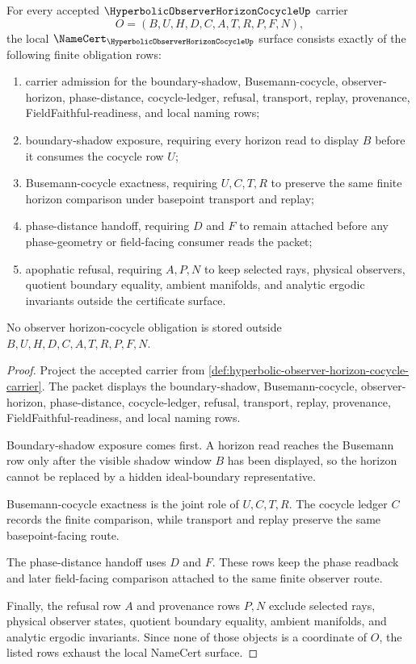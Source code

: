 \begin{theorem}
\label{thm:hyperbolic-observer-horizon-cocycle-namecert-obligations}
For every accepted $\HyperbolicObserverHorizonCocycleUp$ carrier
$$
O=(B,U,H,D,C,A,T,R,P,F,N),
$$
the local $\NameCert_{\HyperbolicObserverHorizonCocycleUp}$ surface consists exactly of the following finite obligation rows:
\begin{enumerate}
\item carrier admission for the boundary-shadow, Busemann-cocycle, observer-horizon, phase-distance, cocycle-ledger, refusal, transport, replay, provenance, FieldFaithful-readiness, and local naming rows;
\item boundary-shadow exposure, requiring every horizon read to display $B$ before it consumes the cocycle row $U$;
\item Busemann-cocycle exactness, requiring $U,C,T,R$ to preserve the same finite horizon comparison under basepoint transport and replay;
\item phase-distance handoff, requiring $D$ and $F$ to remain attached before any phase-geometry or field-facing consumer reads the packet;
\item apophatic refusal, requiring $A,P,N$ to keep selected rays, physical observers, quotient boundary equality, ambient manifolds, and analytic ergodic invariants outside the certificate surface.
\end{enumerate}
No observer horizon-cocycle obligation is stored outside $B,U,H,D,C,A,T,R,P,F,N$.
\end{theorem}
\begin{proof}
Project the accepted carrier from \autoref{def:hyperbolic-observer-horizon-cocycle-carrier}. The packet displays the boundary-shadow, Busemann-cocycle, observer-horizon, phase-distance, cocycle-ledger, refusal, transport, replay, provenance, FieldFaithful-readiness, and local naming rows.

Boundary-shadow exposure comes first. A horizon read reaches the Busemann row only after the visible shadow window $B$ has been displayed, so the horizon cannot be replaced by a hidden ideal-boundary representative.

Busemann-cocycle exactness is the joint role of $U,C,T,R$. The cocycle ledger $C$ records the finite comparison, while transport and replay preserve the same basepoint-facing route.

The phase-distance handoff uses $D$ and $F$. These rows keep the phase readback and later field-facing comparison attached to the same finite observer route.

Finally, the refusal row $A$ and provenance rows $P,N$ exclude selected rays, physical observer states, quotient boundary equality, ambient manifolds, and analytic ergodic invariants. Since none of those objects is a coordinate of $O$, the listed rows exhaust the local NameCert surface.
\end{proof}

